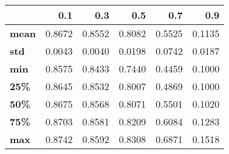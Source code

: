 \begin{tabular}{lrrrrr}
\toprule
{} &     0.1 &     0.3 &     0.5 &     0.7 &     0.9 \\
\midrule
\textbf{mean} &  0.8672 &  0.8552 &  0.8082 &  0.5525 &  0.1135 \\
\textbf{std } &  0.0043 &  0.0040 &  0.0198 &  0.0742 &  0.0187 \\
\textbf{min } &  0.8575 &  0.8433 &  0.7440 &  0.4459 &  0.1000 \\
\textbf{25\% } &  0.8645 &  0.8532 &  0.8007 &  0.4869 &  0.1000 \\
\textbf{50\% } &  0.8675 &  0.8568 &  0.8071 &  0.5501 &  0.1020 \\
\textbf{75\% } &  0.8703 &  0.8581 &  0.8209 &  0.6084 &  0.1283 \\
\textbf{max } &  0.8742 &  0.8592 &  0.8308 &  0.6871 &  0.1518 \\
\bottomrule
\end{tabular}
